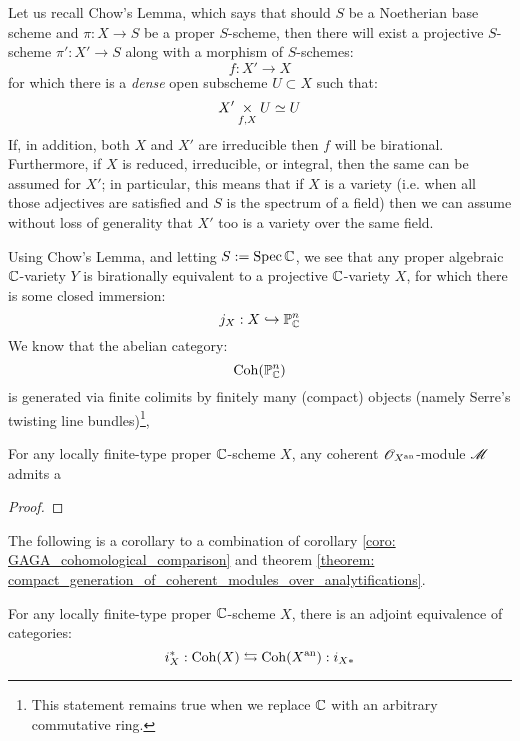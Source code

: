             \begin{remark}
                Let us recall Chow's Lemma, which says that should $S$ be a Noetherian base scheme and $\pi: X \to S$ be a proper $S$-scheme, then there will exist a projective $S$-scheme $\pi': X' \to S$ along with a morphism of $S$-schemes:
                    $$f: X' \to X$$
                for which there is a \textit{dense} open subscheme $U \subset X$ such that:
                    $$X' \x_{f, X} U \cong U$$
                If, in addition, both $X$ and $X'$ are irreducible then $f$ will be birational. Furthermore, if $X$ is reduced, irreducible, or integral, then the same can be assumed for $X'$; in particular, this means that if $X$ is a variety (i.e. when all those adjectives are satisfied and $S$ is the spectrum of a field) then we can assume without loss of generality that $X'$ too is a variety over the same field.

                Using Chow's Lemma, and letting $S := \operatorname{Spec} \mathbb{C}$, we see that any proper algebraic $\mathbb{C}$-variety $Y$ is birationally equivalent to a projective $\mathbb{C}$-variety $X$, for which there is some closed immersion:
                    $$j_X: X \hookrightarrow \mathbb{P}^n_{\mathbb{C}}$$
                We know that the abelian category:
                    $$\mathrm{Coh}(\mathbb{P}^n_{\mathbb{C}})$$
                is generated via finite colimits by finitely many (compact) objects (namely Serre's twisting line bundles)\footnote{This statement remains true when we replace $\mathbb{C}$ with an arbitrary commutative ring.}, 
            \end{remark}

            \begin{theorem} \label{theorem: compact_generation_of_coherent_modules_over_analytifications}
                For any locally finite-type proper $\mathbb{C}$-scheme $X$, any coherent $\mathscr{O}_{X^{\mathrm{an}}}$-module $\mathscr{M}$ admits a 
            \end{theorem}
                \begin{proof}
                    
                \end{proof}
            The following is a corollary to a combination of corollary \ref{coro: GAGA_cohomological_comparison} and theorem \ref{theorem: compact_generation_of_coherent_modules_over_analytifications}.
            \begin{corollary}
                For any locally finite-type proper $\mathbb{C}$-scheme $X$, there is an adjoint equivalence of categories:
                    $$i_X^*: \mathrm{Coh}(X) \leftrightarrows \mathrm{Coh}(X^{\mathrm{an}}): i_{X *}$$
            \end{corollary}
        
    \printbibliography

